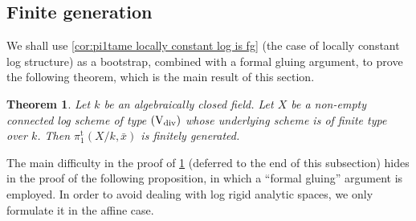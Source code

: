 \documentclass[a4paper,twoside,11pt,reqno]{amsart}
\newcommand{\typeVd}{(\mathrm{V}_{\rm div})}
\newcommand{\pitame}{\pi_1^{\mathrm{t}}}
\newtheorem{thm}{Theorem}[subsection]
\theoremstyle{definition}
\numberwithin{equation}{subsection}
\begin{document}
\subsection{Finite generation} 
\label{ss:strat}

We shall use \cref{cor:pi1tame locally constant log is fg} (the case of locally constant log structure) as a bootstrap, combined with a formal gluing argument, to prove the following theorem, which is the main result of this section. 

\begin{thm} \label{thm:pi1tame log is fg}
    Let $k$ be an algebraically closed field.
    Let $X$ be a non-empty connected log scheme of type $\typeVd$
    whose underlying scheme is of finite type over $k$.
    Then $\pitame(X/k,\bar x)$ is finitely generated.
\end{thm}

The main difficulty in the proof of \cref{thm:pi1tame log is fg} (deferred to the end of this subsection) hides in the proof of the following proposition, in which a ``formal gluing'' argument is employed. In order to avoid dealing with log rigid analytic spaces, we only formulate it in the affine case.
\end{document}
